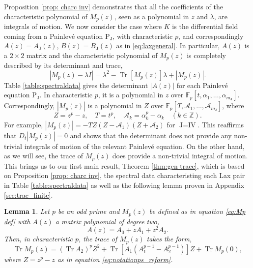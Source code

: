 \documentclass[a4paper,reqno]{amsart}
\numberwithin{equation}{section}
\newtheorem{lemma}[theorem]{Lemma}
\numberwithin{figure}{section}
\theoremstyle{remark}
\newcommand\PJ{\textrm{P}_{\textrm{J}}}
\begin{document}
Proposition \ref{prop: charc inv} demonstrates that all the coefficients of the characteristic polynomial of $M_p(z)$, seen as a polynomial in $z$ and $\lambda$, are integrals of motion. We now consider the case where $K$ is the differential field coming from a Painlev\'e equation $\PJ$, with characteristic $p$, and correspondingly
$A(z)=A_\textrm{J}(z)$, $B(z)=B_\textrm{J}(z)$ as in \eqref{eq:laxgeneral}. In particular, $A(z)$ is a $2\times 2$ matrix and the characteristic polynomial of $M_p(z)$ is completely described by its determinant and trace,
\begin{equation}\label{eq:gen character}
   |M_p(z)-\lambda I|= \lambda^2 - \operatorname{Tr}[M_p(z)]\lambda + |M_p(z)|.
\end{equation}
Table \ref{table:spectraldata} gives the determinant $|A(z)|$ for each Painlev\'e equation $\PJ$. In characteristic $p$, it is a polynomial in $z$ over $\mathbb{F}_p[t,\alpha_1,\ldots,\alpha_{m_\textrm{J}}]$. Correspondingly, $|M_p(z)|$ is a polynomial in $Z$ over $\mathbb{F}_p[T,\mathcal{A}_1,\ldots,\mathcal{A}_{m_\textrm{J}}]$, where
\begin{equation}\label{eq:notationps_reform}
 Z=z^p-z,\quad  T=t^p,\quad \mathcal{A}_k=\alpha_k^p-\alpha_k\quad (k\in\mathbb{Z}).
\end{equation}
For example, $|M_p(z)|=-TZ(Z-\mathcal{A}_1)(Z+\mathcal{A}_2)$ for $\textrm{J}=\textrm{IV}$.
This reaffirms that $D_t|M_p(z)|=0$ and shows that the determinant does not provide any non-trivial integrals of motion of the relevant Painlev\'e equation.
On the other hand, as we will see, the trace of $M_p(z)$ does provide a non-trivial integral of motion. This brings us to our first main result, Theorem \ref{thm:gen trace}, which is based on Proposition \ref{prop: charc inv}, the spectral data characteristing each Lax pair in Table \ref{table:spectraldata} as well as
the following lemma proven in Appendix \ref{sec:trac_finite}.


\begin{lemma}\label{lem:trace}
Let $p$ be an odd prime and $M_p(z)$ be defined as in equation \eqref{eq:Mp def} with $A(z)$ a matrix polynomial of degree two,
\[ A(z) =A_0+z A_1+z^2 A_2 .\]
Then, in characteristic $p$, the trace of $M_p(z)$ takes the form,
    \begin{equation}\label{eq:trace with Ak}
    \operatorname{Tr}M_p(z) =  (\operatorname{Tr}A_2)^pZ^2+
        \operatorname{Tr}[A_1(A_1^{p-1}-A_2^{p-1})]Z+\operatorname{Tr}M_p(0),
\end{equation}
where $ Z=z^p-z$ as in equation \eqref{eq:notationps_reform}.
\end{lemma}
\end{document}
